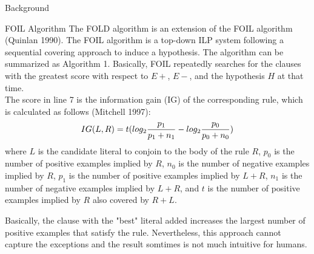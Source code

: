 \documentclass[12pt,a4paper]{article}
\begin{document}
\begin{section}{Background}
		\begin{subsection}{FOIL Algorithm}
		The FOLD algorithm is an extension of the FOIL algorithm (Quinlan 1990). The FOIL algorithm is a top-down ILP system following a sequential covering approach to induce a hypothesis. The algorithm can be summarized as Algorithm 1. Basically, FOIL repeatedly searches for the clauses with the greatest score with respect to $E+$, $E-$, and the hypothesis $H$ at that time.
		\\

		The score in line 7 is the information gain (IG) of the corresponding rule, which is calculated as follows (Mitchell 1997):
		\begin{gather*}
		\centering IG(L,R)=t(log_2{\frac{p_1}{p_1+n_1}}-log_2{\frac{p_0}{p_0+n_0}})
		\end{gather*}
		where $L$ is the candidate literal to conjoin to the body of the rule $R$, $p_0$ is the number of positive examples implied by $R$, $n_0$ is the number of negative examples implied by $R$, $p_1$ is the number of positive examples implied by $L+R$, $n_1$ is the number of negative examples implied by $L+R$, and $t$ is the number of positive examples implied by $R$ also covered by $R+L$.

		Basically, the clause with the "best" literal added increases the largest number of positive examples that satisfy the rule. Nevertheless, this approach cannot capture the exceptions and the result somtimes is not much intuitive for humans.
		\end{subsection}
	\end{section}
\end{document}
